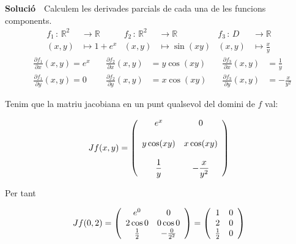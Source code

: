 \documentclass[12pt]{article}
\newcommand{\solucio}{\textbf{Soluci{\'o}}\ \ }
\newcommand{\R}{\mathbb{R}}
\begin{document}
\solucio Calculem les derivades parcials de cada una de les funcions components.
\vspace{0.4cm}\begin{align*}
   f_1\,  : \, \R^2 & \longrightarrow  \R \quad
  & f_2\, : \, \R^2 & \longrightarrow  \R \quad
  & f_3\, : \, D & \longrightarrow  \R \\
  (x,y) &  \mapsto  1+e^x
  & (x,y) & \mapsto  \sin(xy)
  &(x,y) & \mapsto \frac{x}{y}
\end{align*}
\begin{align*}
& \frac{\partial f_1}{\partial x}(x,y)   = e^x \quad  &
\frac{\partial f_2}{\partial x}(x,y)   & =
  y\cos (xy) \quad    & \frac{\partial f_3}{\partial
x}(x,y)  &  = \frac{1}{y}    \\ & \frac{\partial f_1}{\partial
y}(x,y)   =
 0 \quad  & \frac{\partial f_2}{\partial
y}(x,y)  & =
  x\cos (xy) \quad   & \frac{\partial f_3}{\partial
y}(x,y)  & =
 -\frac{x}{y^2}
  \end{align*}

Tenim que la matriu jacobiana en un punt qualsevol del domini de $f$ val:

\begin{equation*}
Jf(x,y) =  \left( \vspace{0.4cm}\begin{array} {cc}
   e^x & 0 \\
   \\
   y \cos(xy) & x \cos(xy) \\
   \\
   \displaystyle\frac{1}{y} & -\displaystyle\frac{x}{y^2} \\
\end{array} \right)
\end{equation*}

Per tant

\vspace{0.4cm}\begin{equation*}
Jf(0,2) = \left( \vspace{0.4cm}\begin{array} {cc}
   e^0 & 0\\
   2 \cos 0 & 0 \cos 0 \\
   \frac{1}{2} & -\frac{0}{2^2} \\
\end{array} \right) = \left( \vspace{0.4cm}\begin{array} {cc}
   1 & 0 \\
   2 & 0 \\
   \frac{1}{2} & 0 \\
\end{array}\right)
\end{equation*}
\end{document}

